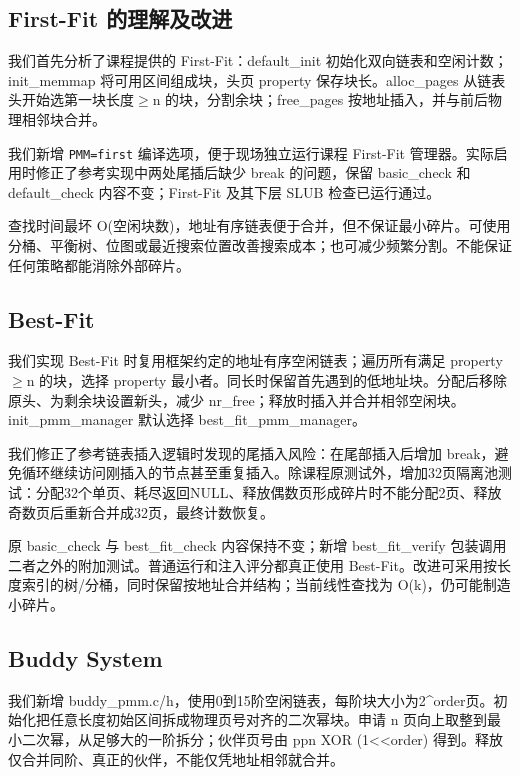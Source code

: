 \documentclass[UTF8,a4paper,10pt]{ctexart}
\begin{document}
\subsection{First-Fit 的理解及改进}

我们首先分析了课程提供的 First-Fit：default\_init 初始化双向链表和空闲计数；init\_memmap 将可用区间组成块，头页 property 保存块长。alloc\_pages 从链表头开始选第一块长度\ensuremath{\geq}n 的块，分割余块；free\_pages 按地址插入，并与前后物理相邻块合并。


我们新增 \nolinkurl{PMM=first} 编译选项，便于现场独立运行课程 First-Fit 管理器。实际启用时修正了参考实现中两处尾插后缺少 break 的问题，保留 basic\_check 和 default\_check 内容不变；First-Fit 及其下层 SLUB 检查已运行通过。


查找时间最坏 O(空闲块数)，地址有序链表便于合并，但不保证最小碎片。可使用分桶、平衡树、位图或最近搜索位置改善搜索成本；也可减少频繁分割。不能保证任何策略都能消除外部碎片。


\subsection{Best-Fit}

我们实现 Best-Fit 时复用框架约定的地址有序空闲链表；遍历所有满足 property\ensuremath{\geq}n 的块，选择 property 最小者。同长时保留首先遇到的低地址块。分配后移除原头、为剩余块设置新头，减少 nr\_free；释放时插入并合并相邻空闲块。init\_pmm\_manager 默认选择 best\_fit\_pmm\_manager。


我们修正了参考链表插入逻辑时发现的尾插入风险：在尾部插入后增加 break，避免循环继续访问刚插入的节点甚至重复插入。除课程原测试外，增加32页隔离池测试：分配32个单页、耗尽返回NULL、释放偶数页形成碎片时不能分配2页、释放奇数页后重新合并成32页，最终计数恢复。


原 basic\_check 与 best\_fit\_check 内容保持不变；新增 best\_fit\_verify 包装调用二者之外的附加测试。普通运行和注入评分都真正使用 Best-Fit。改进可采用按长度索引的树/分桶，同时保留按地址合并结构；当前线性查找为 O(k)，仍可能制造小碎片。


\subsection{Buddy System}

我们新增 buddy\_pmm.c/h，使用0到15阶空闲链表，每阶块大小为2\textasciicircum{}order页。初始化把任意长度初始区间拆成物理页号对齐的二次幂块。申请 n 页向上取整到最小二次幂，从足够大的一阶拆分；伙伴页号由 ppn XOR (1<<order) 得到。释放仅合并同阶、真正的伙伴，不能仅凭地址相邻就合并。
\end{document}
